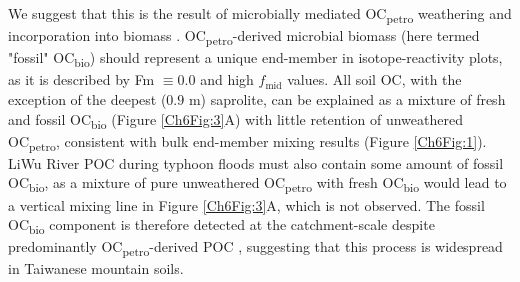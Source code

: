 We suggest that this is the result of microbially mediated OC\textsubscript{petro} weathering and incorporation into biomass \citep{Petsch:2001eq,Petsch:2005gd,Bardgett:2007eb,Schillawski:2008ko,Petsch:2014ct}. OC\textsubscript{petro}-derived microbial biomass (here termed "fossil" OC\textsubscript{bio}) should represent a unique end-member in isotope-reactivity plots, as it is described by Fm $\equiv 0.0$ and high $f_{\text{mid}}$ values. All soil OC, with the exception of the deepest ($0.9$ m) saprolite, can be explained as a mixture of fresh and fossil OC\textsubscript{bio} (Figure \ref{Ch6Fig:3}A) with little retention of unweathered OC\textsubscript{petro}, consistent with bulk end-member mixing results (Figure \ref{Ch6Fig:1}). LiWu River POC during typhoon floods must also contain some amount of fossil OC\textsubscript{bio}, as a mixture of pure unweathered OC\textsubscript{petro} with fresh OC\textsubscript{bio} would lead to a vertical mixing line in Figure \ref{Ch6Fig:3}A, which is not observed. The fossil OC\textsubscript{bio} component is therefore detected at the catchment-scale despite predominantly OC\textsubscript{petro}-derived POC \citep{Hilton:2011jw}, suggesting that this process is widespread in Taiwanese mountain soils. 

